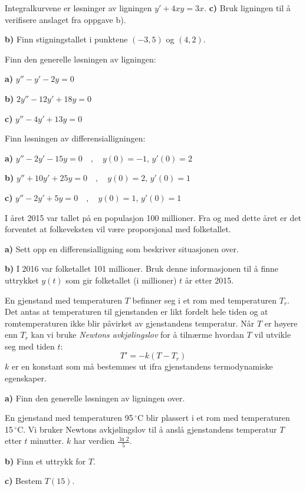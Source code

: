 Integralkurvene er løsninger av ligningen $ y' + 4x y = 3x$. 
\os
\textbf{c)} Bruk ligningen til å verifisere anslaget fra oppgave b).\os

\textbf{b)} Finn stigningstallet i punktene $ (-3, 5) $ og $ (4, 2) $.

\nes
{}
Finn den generelle løsningen av ligningen:\os

\textbf{a)} $ y''-y'-2y =0 $\os

\textbf{b)} $ 2y''-12y'+18y=0 $\os

\textbf{c)} $ y''-4y'+13y=0 $

Finn løsningen av differensialligningen:\os

\textbf{a)} $ y''-2y'-15y=0\quad,\quad y(0)=-1,\,y'(0)=2 $\os

\textbf{b)} $ y''+10y'+25y=0\quad,\quad y(0)=2,\,y'(0)=1  $\os

\textbf{c)} $ y''-2y'+5y=0\quad,\quad y(0)=1,\,y'(0)=1  $

\nes
{}
I året 2015 var tallet på en populasjon 100 millioner. Fra og med dette året er det forventet at folkeveksten vil være proporsjonal med folketallet.\os

\textbf{a)} Sett opp en differensialligning som beskriver situasjonen over.\os

\textbf{b)} I 2016 var folketallet 101 millioner. Bruk denne informasjonen til å finne uttrykket $ y(t) $ som gir folketallet (i millioner) $ t $ år etter 2015.

En gjenstand med temperaturen $ T$ befinner seg i et rom med temperaturen $ T_r $. Det antas at temperaturen til gjenstanden er likt fordelt hele tiden og at romtemperaturen ikke blir påvirket av gjenstandens temperatur. Når $ T$ er høyere enn $ T_r $ kan vi bruke \textit{Newtons avkjølingslov} for å tilnærme hvordan $ T $ vil utvikle seg med tiden $ t $:
\[ T'=-k(T-T_r) \]
$ k $ er en konstant som må bestemmes ut ifra gjenstandens termodynamiske egenskaper. \os

\textbf{a)} Finn den generelle løsningen av ligningen over.

En gjenstand med temperaturen 95\,$ ^\circ $C blir plassert i et rom med temperaturen 15\,$ ^\circ $C. Vi bruker Newtons avkjølingslov til å anslå gjenstandens temperatur $ T $ etter $ t $ minutter. $ k $ har verdien $ \frac{\ln 2}{5} $. \os

\textbf{b)} Finn et uttrykk for $ T $.\os

\textbf{c)} Bestem $ T(15) $.\os

